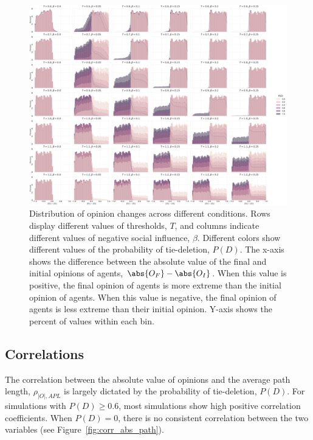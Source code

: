 \documentclass[11pt]{article}
\DeclarePairedDelimiter{\abs}\lvert\rvert
\begin{document}
\begin{figure}[H]
    \centering
    \includegraphics[width=.99\linewidth]{../plots/overall/Radicalization.png}
  \caption{Distribution of opinion changes across different conditions. Rows display different values of thresholds, $T$, and columns indicate different values of negative social influence, $\beta$. Different colors show different values of the probability of tie-deletion, $P(D)$. The x-axis shows the difference between the absolute value of the final and initial opinions of agents, $\abs{O_F} - \abs{O_I}$. When this value is positive, the final opinion of agents is more extreme than the initial opinion of agents. When this value is negative, the final opinion of agents is less extreme than their initial opinion. Y-axis shows the percent of values within each bin. }
  \label{fig:radicalization}
\end{figure}

\subsection{Correlations}
The correlation between the absolute value of opinions and the average path length, $\rho_{|O|, APL}$ is largely dictated by the probability of tie-deletion, $P(D)$. For simulations with $P(D) \geq 0.6$, most simulations show high positive correlation coefficients. When $P(D) = 0$, there is no consistent correlation between the two variables (see Figure~\ref{fig:corr_abs_path}). 
\end{document}
